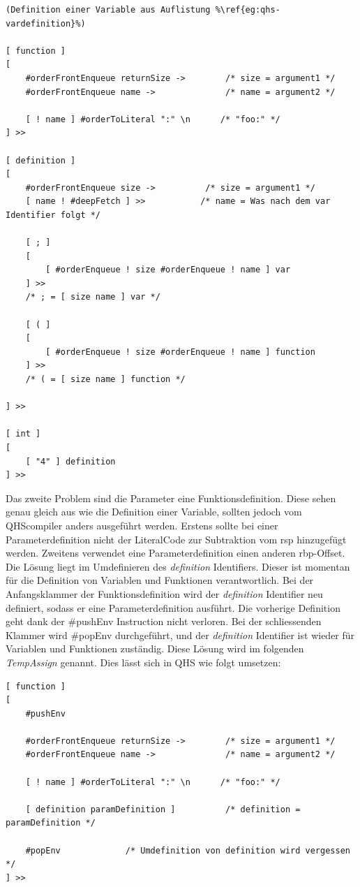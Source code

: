 \begin{minipage}{\linewidth}
\begin{lstlisting}[language=QHS, caption=Implementation eines DelayedExecute für Definitionen]
(Definition einer Variable aus Auflistung %\ref{eg:qhs-vardefinition}%)

[ function ]
[
    #orderFrontEnqueue returnSize ->        /* size = argument1 */
    #orderFrontEnqueue name ->              /* name = argument2 */

    [ ! name ] #orderToLiteral ":" \n      /* "foo:" */
] >>

[ definition ]
[
    #orderFrontEnqueue size ->          /* size = argument1 */
    [ name ! #deepFetch ] >>           /* name = Was nach dem var Identifier folgt */

    [ ; ]
    [
        [ #orderEnqueue ! size #orderEnqueue ! name ] var 
    ] >>
    /* ; = [ size name ] var */

    [ ( ]
    [
        [ #orderEnqueue ! size #orderEnqueue ! name ] function 
    ] >>
    /* ( = [ size name ] function */

] >>

[ int ]
[
    [ "4" ] definition
] >>
\end{lstlisting}
\end{minipage}


Das zweite Problem sind die Parameter eine Funktionsdefinition. Diese sehen genau gleich aus wie die Definition einer Variable, sollten jedoch vom QHScompiler anders ausgeführt werden.
Erstens sollte bei einer Parameterdefinition nicht der LiteralCode zur Subtraktion vom rsp hinzugefügt werden. Zweitens verwendet eine Parameterdefinition einen anderen rbp-Offset.
Die Lösung liegt im Umdefinieren des \textit{definition} Identifiers. Dieser ist momentan für die Definition von Variablen und Funktionen verantwortlich.
Bei der Anfangsklammer der Funktionsdefinition wird der \textit{definition} Identifier neu definiert, sodass er eine Parameterdefinition ausführt. Die vorherige Definition geht dank der \#pushEnv Instruction nicht verloren.
Bei der schliessenden Klammer wird \#popEnv durchgeführt, und der \textit{definition} Identifier ist wieder für Variablen und Funktionen zuständig. Diese Lösung wird im folgenden \textit{TempAssign} genannt.
Dies lässt sich in QHS wie folgt umsetzen:

\begin{minipage}{\linewidth}
\begin{lstlisting}[language=QHS, caption=Implementation eines TempAssigns für Parameter Definitionen]
[ function ]
[
    #pushEnv

    #orderFrontEnqueue returnSize ->        /* size = argument1 */
    #orderFrontEnqueue name ->              /* name = argument2 */

    [ ! name ] #orderToLiteral ":" \n      /* "foo:" */

    [ definition paramDefinition ]          /* definition = paramDefinition */

    #popEnv             /* Umdefinition von definition wird vergessen */
] >>
\end{lstlisting}
\end{minipage}

